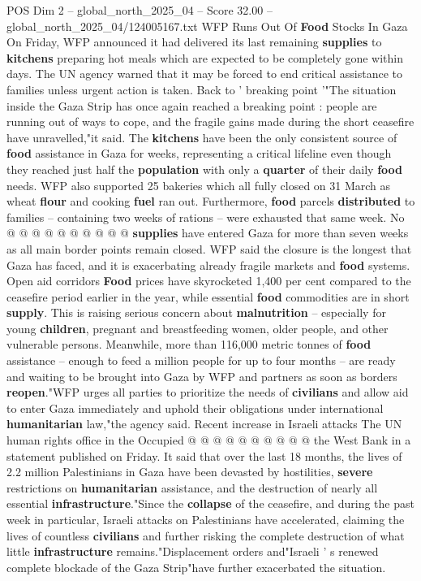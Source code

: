 \begin{textsample}{POS Dim 2 – global\_north\_2025\_04 – Score 32.00 – global\_north\_2025\_04/124005167.txt}  \label{ex:f2_pos_321}
WFP Runs Out Of \textbf{Food} Stocks In Gaza On Friday, WFP announced it had delivered its last remaining \textbf{supplies} to \textbf{kitchens} preparing hot meals which are expected to be completely gone within days.
The UN agency warned that it may be forced to end critical assistance to families unless urgent action is taken.
Back to ' breaking point '"The situation inside the Gaza Strip has once again reached a breaking point : people are running out of ways to cope, and the fragile gains made during the short ceasefire have unravelled,"it said.
The \textbf{kitchens} have been the only consistent source of \textbf{food} assistance in Gaza for weeks, representing a critical lifeline even though they reached just half the \textbf{population} with only a \textbf{quarter} of their daily \textbf{food} needs.
WFP also supported 25 bakeries which all fully closed on 31 March as wheat \textbf{flour} and cooking \textbf{fuel} ran out.
Furthermore, \textbf{food} parcels \textbf{distributed} to families -- containing two weeks of rations -- were exhausted that same week.
No @ @ @ @ @ @ @ @ @ @ \textbf{supplies} have entered Gaza for more than seven weeks as all main border points remain closed.
WFP said the closure is the longest that Gaza has faced, and it is exacerbating already fragile markets and \textbf{food} systems.
Open aid corridors \textbf{Food} prices have skyrocketed 1,400 per cent compared to the ceasefire period earlier in the year, while essential \textbf{food} commodities are in short \textbf{supply}.
This is raising serious concern about \textbf{malnutrition} -- especially for young \textbf{children}, pregnant and breastfeeding women, older people, and other vulnerable persons.
Meanwhile, more than 116,000 metric tonnes of \textbf{food} assistance -- enough to feed a million people for up to four months -- are ready and waiting to be brought into Gaza by WFP and partners as soon as borders \textbf{reopen}."WFP urges all parties to prioritize the needs of \textbf{civilians} and allow aid to enter Gaza immediately and uphold their obligations under international \textbf{humanitarian} law,"the agency said.
Recent increase in Israeli attacks The UN human rights office in the Occupied @ @ @ @ @ @ @ @ @ @ the West Bank in a statement published on Friday.
It said that over the last 18 months, the lives of 2.2 million Palestinians in Gaza have been devasted by hostilities, \textbf{severe} restrictions on \textbf{humanitarian} assistance, and the destruction of nearly all essential \textbf{infrastructure}."Since the \textbf{collapse} of the ceasefire, and during the past week in particular, Israeli attacks on Palestinians have accelerated, claiming the lives of countless \textbf{civilians} and further risking the complete destruction of what little \textbf{infrastructure} remains."Displacement orders and"Israeli ' s renewed complete blockade of the Gaza Strip"have further exacerbated the situation.

\end{textsample}
